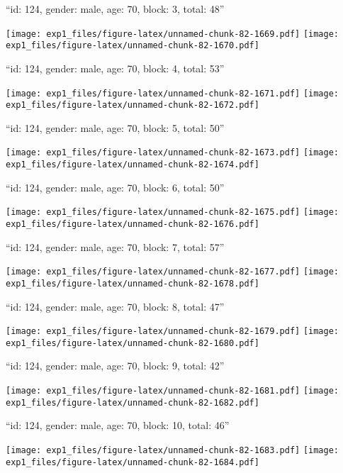 \documentclass[11pt,,]{article}
\begin{document}
\newpage
[1] 

``id: 124, gender: male, age: 70, block: 3, total: 48''

\texttt{[image: exp1\_files/figure-latex/unnamed-chunk-82-1669.pdf]}
\texttt{[image: exp1\_files/figure-latex/unnamed-chunk-82-1670.pdf]}

\newpage
[1] 

``id: 124, gender: male, age: 70, block: 4, total: 53''

\texttt{[image: exp1\_files/figure-latex/unnamed-chunk-82-1671.pdf]}
\texttt{[image: exp1\_files/figure-latex/unnamed-chunk-82-1672.pdf]}

\newpage
[1] 

``id: 124, gender: male, age: 70, block: 5, total: 50''

\texttt{[image: exp1\_files/figure-latex/unnamed-chunk-82-1673.pdf]}
\texttt{[image: exp1\_files/figure-latex/unnamed-chunk-82-1674.pdf]}

\newpage
[1] 

``id: 124, gender: male, age: 70, block: 6, total: 50''

\texttt{[image: exp1\_files/figure-latex/unnamed-chunk-82-1675.pdf]}
\texttt{[image: exp1\_files/figure-latex/unnamed-chunk-82-1676.pdf]}

\newpage
[1] 

``id: 124, gender: male, age: 70, block: 7, total: 57''

\texttt{[image: exp1\_files/figure-latex/unnamed-chunk-82-1677.pdf]}
\texttt{[image: exp1\_files/figure-latex/unnamed-chunk-82-1678.pdf]}

\newpage
[1] 

``id: 124, gender: male, age: 70, block: 8, total: 47''

\texttt{[image: exp1\_files/figure-latex/unnamed-chunk-82-1679.pdf]}
\texttt{[image: exp1\_files/figure-latex/unnamed-chunk-82-1680.pdf]}

\newpage
[1] 

``id: 124, gender: male, age: 70, block: 9, total: 42''

\texttt{[image: exp1\_files/figure-latex/unnamed-chunk-82-1681.pdf]}
\texttt{[image: exp1\_files/figure-latex/unnamed-chunk-82-1682.pdf]}

\newpage
[1] 

``id: 124, gender: male, age: 70, block: 10, total: 46''

\texttt{[image: exp1\_files/figure-latex/unnamed-chunk-82-1683.pdf]}
\texttt{[image: exp1\_files/figure-latex/unnamed-chunk-82-1684.pdf]}
\end{document}
